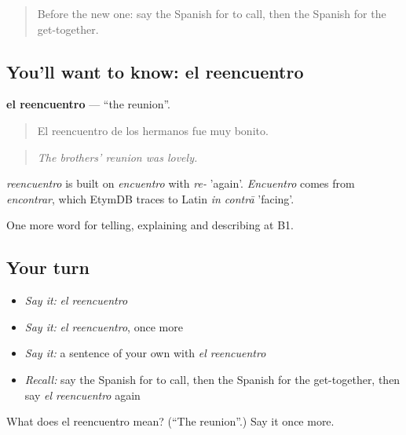 \label{lesson:ES-C560-reencuentro}



\begin{quote}
Before the new one: say the Spanish for to call, then the Spanish for the get-together.
\end{quote}

\subsection*{You'll want to know: el reencuentro}
\textbf{el reencuentro} — \textquotedblleft{}the reunion\textquotedblright{}.

\begin{quote}
El reencuentro de los hermanos fue muy bonito.
\end{quote}

\begin{quote}
\emph{The brothers' reunion was lovely.}
\end{quote}

\begin{cousinweb}
\emph{reencuentro} is built on \emph{encuentro} with \emph{re-} 'again'. \emph{Encuentro} comes from \emph{encontrar}, which EtymDB traces to Latin \emph{in contrā} 'facing'.
\end{cousinweb}

\begin{grammarlens}[title={What you've built}]
One more word for telling, explaining and describing at B1.
\end{grammarlens}

\subsection*{Your turn}
\begin{itemize}
\raggedright
  \item \emph{Say it:} \emph{el reencuentro}
  \item \emph{Say it:} \emph{el reencuentro}, once more
  \item \emph{Say it:} a sentence of your own with \emph{el reencuentro}
  \item \emph{Recall:} say the Spanish for to call, then the Spanish for the get-together, then say \emph{el reencuentro} again
\end{itemize}

\begin{tcolorbox}[breakable,colback=teal!4,colframe=teal!35!black,title={Before you move on}]
What does el reencuentro mean? (\textquotedblleft{}The reunion\textquotedblright{}.) Say it once more.
\end{tcolorbox}
